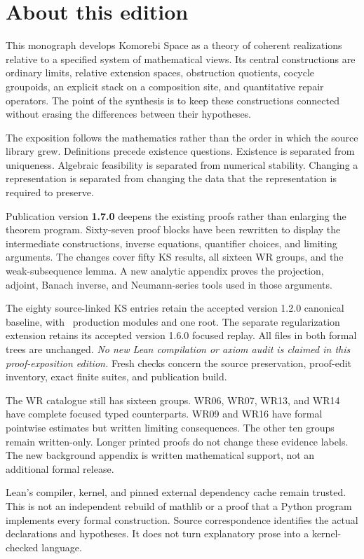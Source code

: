 \documentclass[11pt]{article}
\begin{document}
\KomorebiCover
{}
\section*{About this edition}
This monograph develops Komorebi Space as a theory of coherent realizations relative to a specified system of mathematical views. Its central constructions are ordinary limits, relative extension spaces, obstruction quotients, cocycle groupoids, an explicit stack on a composition site, and quantitative repair operators. The point of the synthesis is to keep these constructions connected without erasing the differences between their hypotheses.

The exposition follows the mathematics rather than the order in which the source library grew. Definitions precede existence questions. Existence is separated from uniqueness. Algebraic feasibility is separated from numerical stability. Changing a representation is separated from changing the data that the representation is required to preserve.

Publication version \textbf{1.7.0} deepens the existing proofs rather than enlarging the theorem program. Sixty-seven proof blocks have been rewritten to display the intermediate constructions, inverse equations, quantifier choices, and limiting arguments. The changes cover fifty KS results, all sixteen WR groups, and the weak-subsequence lemma. A new analytic appendix proves the projection, adjoint, Banach inverse, and Neumann-series tools used in those arguments.

The eighty source-linked KS entries retain the accepted version 1.2.0 canonical baseline, with \EditionFormalModules\ production modules and one root. The separate regularization extension retains its accepted version 1.6.0 focused replay. All files in both formal trees are unchanged. \emph{No new Lean compilation or axiom audit is claimed in this proof-exposition edition.} Fresh checks concern the source preservation, proof-edit inventory, exact finite suites, and publication build.

The WR catalogue still has sixteen groups. WR06, WR07, WR13, and WR14 have complete focused typed counterparts. WR09 and WR16 have formal pointwise estimates but written limiting consequences. The other ten groups remain written-only. Longer printed proofs do not change these evidence labels. The new background appendix is written mathematical support, not an additional formal release.

Lean's compiler, kernel, and pinned external dependency cache remain trusted. This is not an independent rebuild of mathlib or a proof that a Python program implements every formal construction. Source correspondence identifies the actual declarations and hypotheses. It does not turn explanatory prose into a kernel-checked language.
\end{document}

